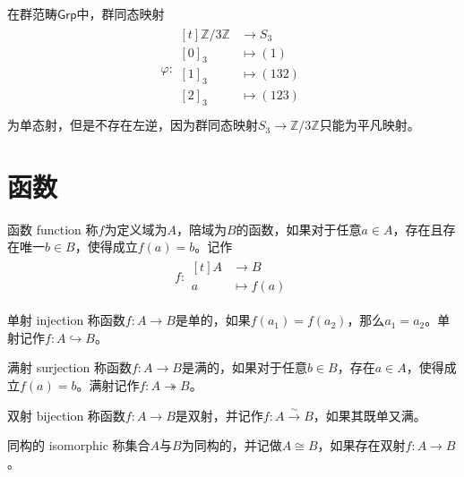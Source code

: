 \documentclass[lang = cn, scheme = chinese, thmcnt = section]{elegantbook}
\newcommand{\Z}{\mathbb{Z}}            %
\begin{document}
\begin{example}
	在群范畴$\mathsf{Grp}$中，群同态映射
	\begin{align*}
		\varphi:\begin{aligned}[t]
			\Z/3\Z &\longrightarrow S_3\\
			[0]_3 &\longmapsto (1)\\
			[1]_3 &\longmapsto (132)\\
			[2]_3 &\longmapsto (123)\\
		\end{aligned}
	\end{align*}
	为单态射，但是不存在左逆，因为群同态映射$S_3\to \Z/3\Z$只能为平凡映射。
\end{example}

\section{函数}

\begin{definition}{函数 function}
	称$f$为定义域为$A$，陪域为$B$的函数，如果对于任意$a\in A$，存在且存在唯一$b\in B$，使得成立$f(a)=b$。记作
	\begin{align*}
		f: \begin{aligned}[t]
			A&\longrightarrow B\\
			a&\longmapsto f(a)
		\end{aligned}
	\end{align*}
\end{definition}

\begin{definition}{单射 injection}
	称函数$f:A\to B$是单的，如果$f(a_1)=f(a_2)$，那么$a_1=a_2$。单射记作$f:A\hookrightarrow B$。
\end{definition}

\begin{definition}{满射 surjection}
	称函数$f:A\to B$是满的，如果对于任意$b\in B$，存在$a\in A$，使得成立$f(a)=b$。满射记作$f:A\twoheadrightarrow B$。
\end{definition}

\begin{definition}{双射 bijection}
	称函数$f:A\to B$是双射，并记作$f:A\xrightarrow{\sim}B$，如果其既单又满。
\end{definition}

\begin{definition}{同构的 isomorphic}
	称集合$A$与$B$为同构的，并记做$A\cong B$，如果存在双射$f:A\to B$。
\end{definition}
\end{document}
